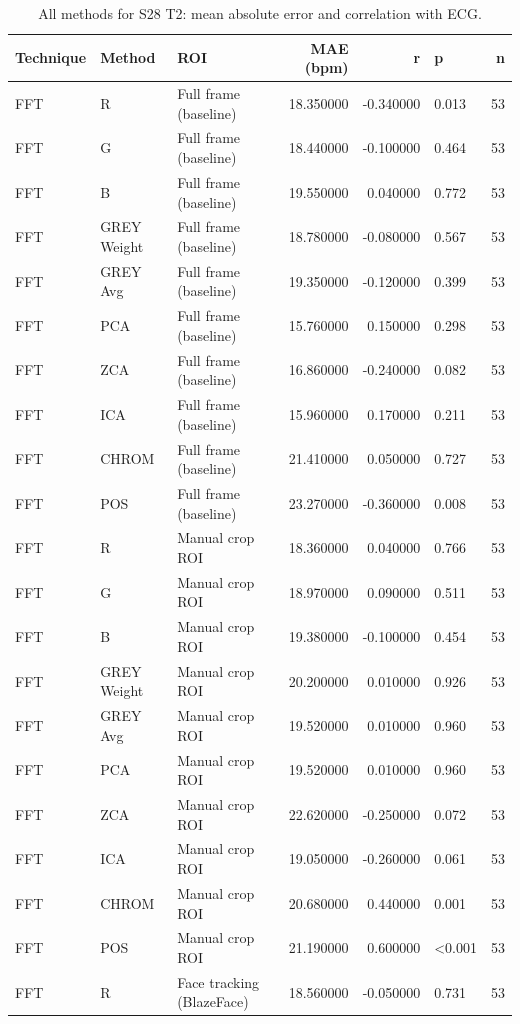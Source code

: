 \begin{table}[htbp]
\centering
\caption{All methods for S28 T2: mean absolute error and correlation with ECG.}
\label{tab:spread_s28_t2}
\begin{tabular}{l l l r r l r}
\toprule
Technique & Method & ROI & MAE (bpm) & r & p & n \\
\midrule
FFT & R & Full frame (baseline) & 18.350000 & -0.340000 & 0.013 & 53 \\
FFT & G & Full frame (baseline) & 18.440000 & -0.100000 & 0.464 & 53 \\
FFT & B & Full frame (baseline) & 19.550000 & 0.040000 & 0.772 & 53 \\
FFT & GREY Weight & Full frame (baseline) & 18.780000 & -0.080000 & 0.567 & 53 \\
FFT & GREY Avg & Full frame (baseline) & 19.350000 & -0.120000 & 0.399 & 53 \\
FFT & PCA & Full frame (baseline) & 15.760000 & 0.150000 & 0.298 & 53 \\
FFT & ZCA & Full frame (baseline) & 16.860000 & -0.240000 & 0.082 & 53 \\
FFT & ICA & Full frame (baseline) & 15.960000 & 0.170000 & 0.211 & 53 \\
FFT & CHROM & Full frame (baseline) & 21.410000 & 0.050000 & 0.727 & 53 \\
FFT & POS & Full frame (baseline) & 23.270000 & -0.360000 & 0.008 & 53 \\
FFT & R & Manual crop ROI & 18.360000 & 0.040000 & 0.766 & 53 \\
FFT & G & Manual crop ROI & 18.970000 & 0.090000 & 0.511 & 53 \\
FFT & B & Manual crop ROI & 19.380000 & -0.100000 & 0.454 & 53 \\
FFT & GREY Weight & Manual crop ROI & 20.200000 & 0.010000 & 0.926 & 53 \\
FFT & GREY Avg & Manual crop ROI & 19.520000 & 0.010000 & 0.960 & 53 \\
FFT & PCA & Manual crop ROI & 19.520000 & 0.010000 & 0.960 & 53 \\
FFT & ZCA & Manual crop ROI & 22.620000 & -0.250000 & 0.072 & 53 \\
FFT & ICA & Manual crop ROI & 19.050000 & -0.260000 & 0.061 & 53 \\
FFT & CHROM & Manual crop ROI & 20.680000 & 0.440000 & 0.001 & 53 \\
FFT & POS & Manual crop ROI & 21.190000 & 0.600000 & <0.001 & 53 \\
FFT & R & Face tracking (BlazeFace) & 18.560000 & -0.050000 & 0.731 & 53 \\

\end{tabular}
\end{table}
